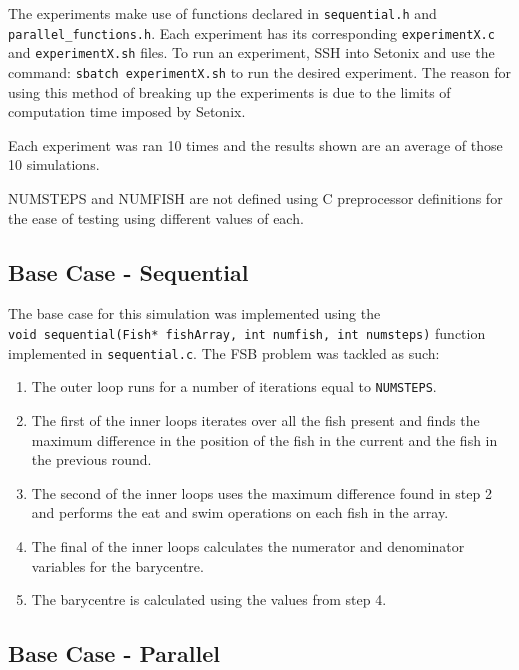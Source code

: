 \documentclass[
]{article}
\begin{document}
The experiments make use of functions declared in \texttt{sequential.h}
and \texttt{parallel\_functions.h}. Each experiment has its
corresponding \texttt{experimentX.c} and \texttt{experimentX.sh} files.
To run an experiment, SSH into Setonix and use the command:
\texttt{sbatch\ experimentX.sh} to run the desired experiment. The
reason for using this method of breaking up the experiments is due to
the limits of computation time imposed by Setonix.

Each experiment was ran 10 times and the results shown are an average of
those 10 simulations.

NUMSTEPS and NUMFISH are not defined using C preprocessor definitions
for the ease of testing using different values of each.

\hypertarget{base-case---sequential}{%
\subsection{Base Case - Sequential}\label{base-case---sequential}}

The base case for this simulation was implemented using the
\texttt{void\ sequential(Fish*\ fishArray,\ int\ numfish,\ int\ numsteps)}
function implemented in \texttt{sequential.c}. The FSB problem was
tackled as such:

\begin{enumerate}
\def\labelenumi{\arabic{enumi}.}
\item
  The outer loop runs for a number of iterations equal to
  \texttt{NUMSTEPS}.
\item
  The first of the inner loops iterates over all the fish present and
  finds the maximum difference in the position of the fish in the
  current and the fish in the previous round.
\item
  The second of the inner loops uses the maximum difference found in
  step 2 and performs the eat and swim operations on each fish in the
  array.
\item
  The final of the inner loops calculates the numerator and denominator
  variables for the barycentre.
\item
  The barycentre is calculated using the values from step 4.
\end{enumerate}

\hypertarget{base-case---parallel}{%
\subsection{Base Case - Parallel}\label{base-case---parallel}}
\end{document}
